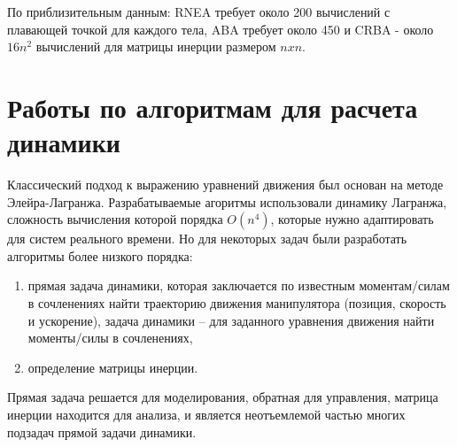 \documentclass[a4paper,14pt]{extreport}
\begin{document}
По приблизительным данным: RNEA требует около 200 вычислений с плавающей точкой для каждого тела, ABA требует около 450 и CRBA - около $16n^2$ вычислений для матрицы инерции размером $nxn$.


\section{Работы по алгоритмам для расчета динамики}



Классический подход к выражению уравнений движения был основан на методе Элейра-Лагранжа. Разрабатываемые агоритмы использовали динамику Лагранжа, сложность вычисления которой порядка $O(n^4)$, которые нужно адаптировать для систем реального времени.
Но для некоторых задач были разработать алгоритмы более низкого порядка:
\begin{enumerate}
	\item прямая задача динамики, которая заключается по известным моментам/силам в сочленениях найти траекторию движения манипулятора (позиция, скорость и ускорение),
	 задача динамики -- для заданного уравнения движения найти моменты/силы в сочленениях,
	\item определение матрицы инерции.
\end{enumerate}

Прямая задача решается для моделирования, обратная для управления, матрица инерции находится для анализа, и является неотъемлемой частью многих подзадач прямой задачи динамики.
\end{document}
